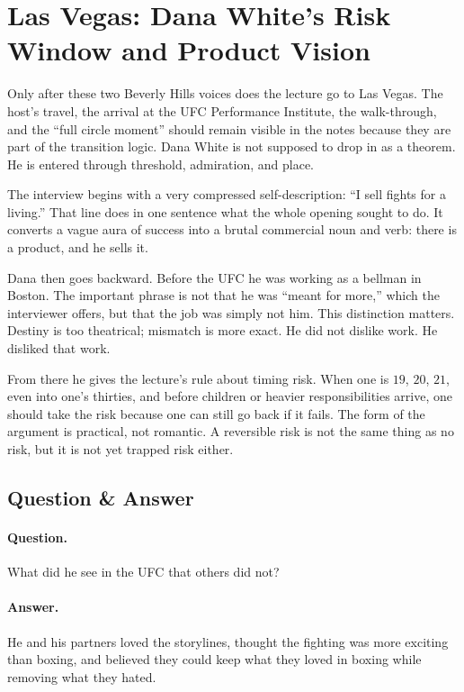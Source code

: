 \section{Las Vegas: Dana White's Risk Window and Product Vision}

Only after these two Beverly Hills voices does the lecture go to Las Vegas. The host's travel, the arrival at the UFC Performance Institute, the walk-through, and the ``full circle moment'' should remain visible in the notes because they are part of the transition logic. Dana White is not supposed to drop in as a theorem. He is entered through threshold, admiration, and place.

The interview begins with a very compressed self-description: ``I sell fights for a living.'' That line does in one sentence what the whole opening sought to do. It converts a vague aura of success into a brutal commercial noun and verb: there is a product, and he sells it.

Dana then goes backward. Before the UFC he was working as a bellman in Boston. The important phrase is not that he was ``meant for more,'' which the interviewer offers, but that the job was simply not him. This distinction matters. Destiny is too theatrical; mismatch is more exact. He did not dislike work. He disliked that work.

From there he gives the lecture's rule about timing risk. When one is \(19\), \(20\), \(21\), even into one's thirties, and before children or heavier responsibilities arrive, one should take the risk because one can still go back if it fails. The form of the argument is practical, not romantic. A reversible risk is not the same thing as no risk, but it is not yet trapped risk either.

\subsection{Question \& Answer}

\paragraph{Question.}
What did he see in the UFC that others did not?

\paragraph{Answer.}
He and his partners loved the storylines, thought the fighting was more exciting than boxing, and believed they could keep what they loved in boxing while removing what they hated.

